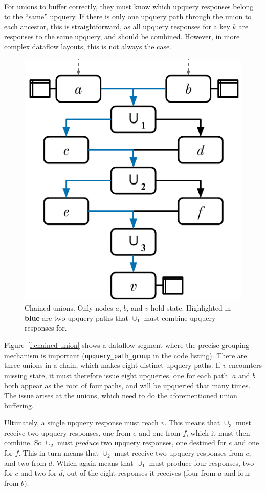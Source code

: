 For unions to buffer correctly, they must know which upquery responses belong to
the ``same'' upquery. If there is only one upquery path through the union to
each ancestor, this is straightforward, as all upquery responses for a key $k$
are responses to the same upquery, and should be combined. However, in more
complex dataflow layouts, this is not always the case.

\begin{figure}[t]
  \centering
  \includegraphics{diagrams/Chained Unions.pdf}
  \caption{Chained unions. Only nodes $a$, $b$, and $v$ hold state. Highlighted
  in \textbf{\color{set1}blue} are two upquery paths that $\cup_1$ must combine
  upquery responses for.}
  \label{f:chained-union}
\end{figure}

Figure~\vref{f:chained-union} shows a dataflow segment where the precise grouping
mechanism is important (\texttt{upquery\_path\_group} in the code listing).
There are three unions in a chain, which makes eight distinct upquery paths. If
$v$ encounters missing state, it must therefore issue eight upqueries, one for
each path. $a$ and $b$ both appear as the root of four paths, and will be
upqueried that many times. The issue arises at the unions, which need to do
the aforementioned union buffering.

Ultimately, a single upquery response must reach $v$. This means that $\cup_3$
must receive two upquery responses, one from $e$ and one from $f$, which it must
then combine. So $\cup_2$ must \emph{produce} two upquery responses, one
destined for $e$ and one for $f$. This in turn means that $\cup_2$ must receive
two upquery responses from $c$, and two from $d$. Which again means that
$\cup_1$ must produce four responses, two for $c$ and two for $d$, out of the
eight responses it receives (four from $a$ and four from $b$).

